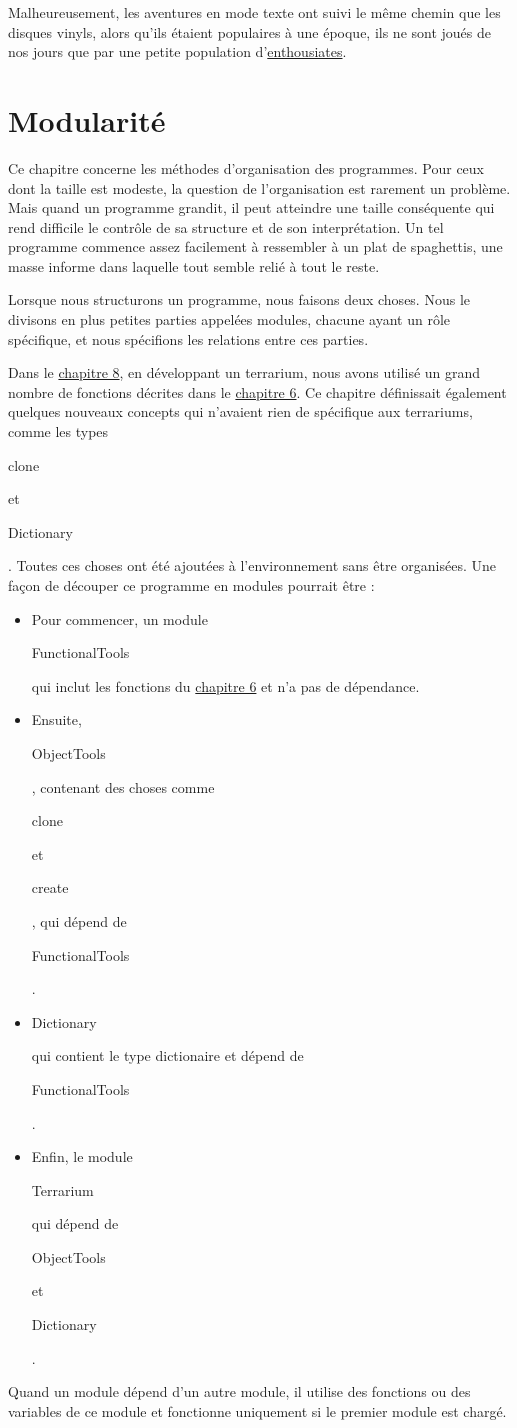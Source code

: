 \documentclass{FramateX}
\renewcommand{\texttt}[1]{\begin{sffamily}{#1}\end{sffamily}}
\begin{document}
Malheureusement, les aventures en mode texte ont suivi le même chemin
que les disques vinyls, alors qu'ils étaient populaires à une époque,
ils ne sont joués de nos jours que par une petite population
d'\href{http://groups.google.com/group/rec.arts.int-fiction/topics}{enthousiates}.


\chapter{Modularité}

Ce chapitre concerne les méthodes d'organisation des programmes. Pour
ceux dont la taille est modeste, la question de l'organisation est
rarement un problème. Mais quand un programme grandit, il peut atteindre
une taille conséquente qui rend difficile le contrôle de sa structure et
de son interprétation. Un tel programme commence assez facilement à
ressembler à un plat de spaghettis, une masse informe dans laquelle tout
semble relié à tout le reste.

Lorsque nous structurons un programme, nous faisons deux choses. Nous le
divisons en plus petites parties appelées modules, chacune ayant un rôle
spécifique, et nous spécifions les relations entre ces parties.

Dans le \href{chapter8.html}{chapitre 8}, en développant un terrarium,
nous avons utilisé un grand nombre de fonctions décrites dans le
\href{chapter6.html}{chapitre 6}. Ce chapitre définissait également
quelques nouveaux concepts qui n'avaient rien de spécifique aux
terrariums, comme les types \texttt{clone} et \texttt{Dictionary}.
Toutes ces choses ont été ajoutées à l'environnement sans être
organisées. Une façon de découper ce programme en modules pourrait être
:

\begin{itemize}
\item
  Pour commencer, un module \texttt{FunctionalTools} qui inclut les
  fonctions du \href{chapter6.html}{chapitre 6} et n'a pas de
  dépendance.
\item
  Ensuite, \texttt{ObjectTools}, contenant des choses comme
  \texttt{clone} et \texttt{create}, qui dépend de
  \texttt{FunctionalTools}.
\item
  \texttt{Dictionary} qui contient le type dictionaire et dépend de
  \texttt{FunctionalTools}.
\item
  Enfin, le module \texttt{Terrarium} qui dépend de \texttt{ObjectTools}
  et \texttt{Dictionary}.
\end{itemize}
Quand un module dépend d'un autre module, il utilise des fonctions ou
des variables de ce module et fonctionne uniquement si le premier module
est chargé.
\end{document}
